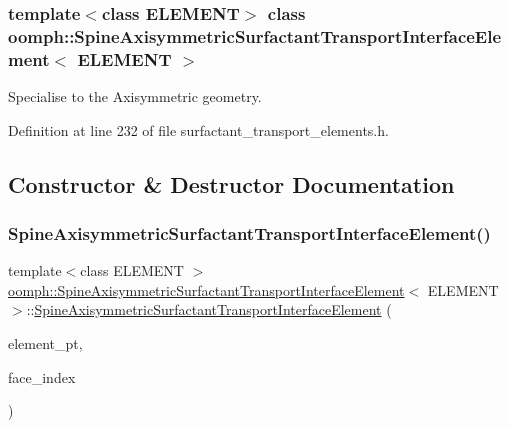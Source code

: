 \subsubsection*{template$<$class E\+L\+E\+M\+E\+NT$>$\newline
class oomph\+::\+Spine\+Axisymmetric\+Surfactant\+Transport\+Interface\+Element$<$ E\+L\+E\+M\+E\+N\+T $>$}

Specialise to the Axisymmetric geometry. 

Definition at line 232 of file surfactant\+\_\+transport\+\_\+elements.\+h.



\subsection{Constructor \& Destructor Documentation}
\mbox{\label{classoomph_1_1SpineAxisymmetricSurfactantTransportInterfaceElement_a60ac6b568dc388e584d423d4b4e9438a}} 
\subsubsection{\texorpdfstring{Spine\+Axisymmetric\+Surfactant\+Transport\+Interface\+Element()}{SpineAxisymmetricSurfactantTransportInterfaceElement()}}
{\footnotesize\ttfamily template$<$class E\+L\+E\+M\+E\+NT $>$ \\
\hyperlink{classoomph_1_1SpineAxisymmetricSurfactantTransportInterfaceElement}{oomph\+::\+Spine\+Axisymmetric\+Surfactant\+Transport\+Interface\+Element}$<$ E\+L\+E\+M\+E\+NT $>$\+::\hyperlink{classoomph_1_1SpineAxisymmetricSurfactantTransportInterfaceElement}{Spine\+Axisymmetric\+Surfactant\+Transport\+Interface\+Element} (\begin{DoxyParamCaption}\item[{\hyperlink{classoomph_1_1FiniteElement}{Finite\+Element} $\ast$const \&}]{element\+\_\+pt,  }\item[{const int \&}]{face\+\_\+index }\end{DoxyParamCaption})\hspace{0.3cm}{\ttfamily [inline]}}



